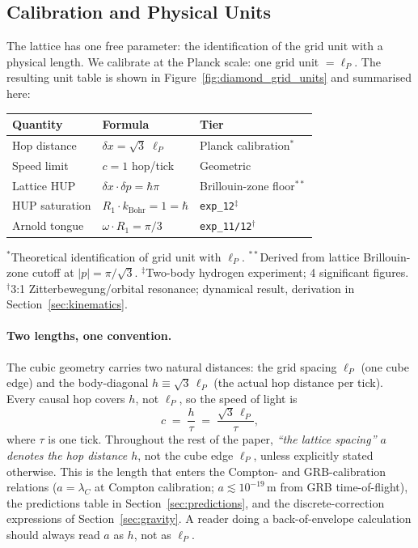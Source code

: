 \subsection{Calibration and Physical Units}
\label{subsec:calibration}

The lattice has one free parameter: the identification of the grid unit with
a physical length.
We calibrate at the Planck scale: one grid unit $= \ell_P$.
The resulting unit table is shown in Figure~\ref{fig:diamond_grid_units}
and summarised here:

\begin{center}
\begin{tabular}{lll}
\hline
Quantity & Formula & Tier \\
\hline
Hop distance   & $\delta x = \sqrt{3}\;\ell_P$    & Planck calibration$^*$ \\
Speed limit    & $c = 1$ hop/tick                  & Geometric \\
Lattice HUP    & $\delta x \cdot \delta p = \hbar\pi$ & Brillouin-zone floor$^{**}$ \\
HUP saturation & $R_1 \cdot k_\text{Bohr} = 1 = \hbar$ & \texttt{exp\_12}$^\ddagger$ \\
Arnold tongue  & $\omega \cdot R_1 = \pi/3$        & \texttt{exp\_11/12}$^\dagger$ \\
\hline
\end{tabular}
\end{center}

\noindent
$^*$Theoretical identification of grid unit with $\ell_P$.
$^{**}$Derived from lattice Brillouin-zone cutoff at $|p| = \pi/\sqrt{3}$.
$^\ddagger$Two-body hydrogen experiment; 4 significant figures.
$^\dagger$3:1 Zitterbewegung/orbital resonance; dynamical result,
derivation in Section~\ref{sec:kinematics}.

\paragraph{Two lengths, one convention.}
The cubic geometry carries two natural distances: the grid spacing
$\ell_P$ (one cube edge) and the body-diagonal $h \equiv \sqrt{3}\,\ell_P$
(the actual hop distance per tick).  Every causal hop covers $h$, not
$\ell_P$, so the speed of light is
\begin{equation}
    c \;=\; \frac{h}{\tau} \;=\; \frac{\sqrt{3}\,\ell_P}{\tau},
    \label{eq:c_definition}
\end{equation}
where $\tau$ is one tick.  Throughout the rest of the paper,
\emph{``the lattice spacing'' $a$ denotes the hop distance $h$}, not
the cube edge $\ell_P$, unless explicitly stated otherwise.  This is
the length that enters the Compton- and GRB-calibration relations
($a = \lambda_C$ at Compton calibration; $a \lesssim 10^{-19}\,\text{m}$
from GRB time-of-flight), the predictions table in
Section~\ref{sec:predictions}, and the discrete-correction expressions
of Section~\ref{sec:gravity}.  A reader doing a back-of-envelope
calculation should always read $a$ as $h$, not as $\ell_P$.

